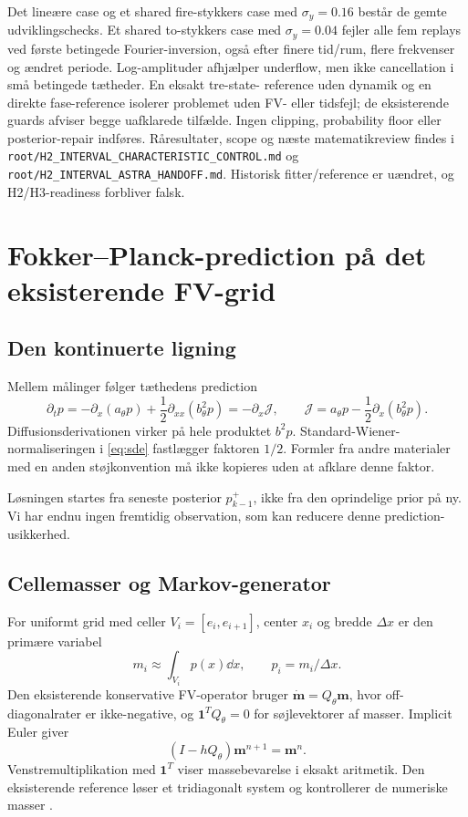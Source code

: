 Det lineære case og et shared fire-stykkers case med \(\sigma_y=0.16\) består
de gemte udviklingschecks. Et shared to-stykkers case med \(\sigma_y=0.04\)
fejler alle fem replays ved første betingede Fourier-inversion, også efter
finere tid/rum, flere frekvenser og ændret periode. Log-amplituder afhjælper
underflow, men ikke cancellation i små betingede tætheder. En eksakt tre-state-
reference uden dynamik og en direkte fase-reference isolerer problemet uden
FV- eller tidsfejl; de eksisterende guards afviser begge uafklarede tilfælde.
Ingen clipping, probability floor eller posterior-repair indføres. Råresultater,
scope og næste matematikreview findes i
\texttt{root/H2\_INTERVAL\_CHARACTERISTIC\_CONTROL.md} og
\texttt{root/H2\_INTERVAL\_ASTRA\_HANDOFF.md}. Historisk fitter/reference er
uændret, og H2/H3-readiness forbliver falsk.

\section{Fokker--Planck-prediction på det eksisterende FV-grid}
\subsection{Den kontinuerte ligning}
Mellem målinger følger tæthedens prediction
\begin{equation}
 \partial_t p=-\partial_x(a_\theta p)+\frac12\partial_{xx}(b_\theta^2p)
             =-\partial_x\mathcal J,\qquad
 \mathcal J=a_\theta p-\frac12\partial_x(b_\theta^2p).
 \label{eq:fp}
\end{equation}
Diffusionsderivationen virker på hele produktet \(b^2p\). Standard-Wiener-normaliseringen i \eqref{eq:sde} fastlægger faktoren \(1/2\). Formler fra andre materialer med en anden støjkonvention må ikke kopieres uden at afklare denne faktor.

Løsningen startes fra seneste posterior \(p_{k-1}^+\), ikke fra den oprindelige prior på ny. Vi har endnu ingen fremtidig observation, som kan reducere denne prediction-usikkerhed.

\subsection{Cellemasser og Markov-generator}
For uniformt grid med celler \(V_i=[e_i,e_{i+1}]\), center \(x_i\) og bredde \(\Delta x\) er den primære variabel
\begin{equation}
 m_i\approx\int_{V_i}p(x)\dd x,\qquad p_i=m_i/\Delta x.
 \label{eq:mass}
\end{equation}
Den eksisterende konservative FV-operator bruger \(\dot{\bm m}=Q_\theta\bm m\), hvor off-diagonalrater er ikke-negative, og \(\bm1^TQ_\theta=0\) for søjlevektorer af masser. Implicit Euler giver
\begin{equation}
 (I-hQ_\theta)\bm m^{n+1}=\bm m^n.
 \label{eq:be}
\end{equation}
Venstremultiplikation med \(\bm1^T\) viser massebevarelse i eksakt aritmetik. Den eksisterende reference løser et tridiagonalt system og kontrollerer de numeriske masser \cite{repo}.

